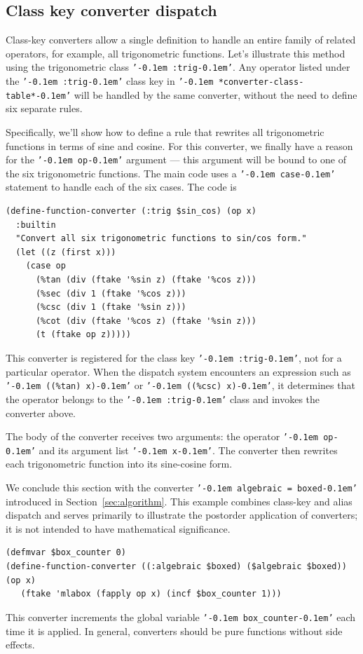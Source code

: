 \documentclass[12pt,fleqn]{extarticle}
\newcommand{\ttq}[1]{\texttt{'\kern-0.1em #1\kern-0.1em'}}
\newenvironment{maximabox}
  {\begin{tcolorbox}[
      breakable,
      enhanced,
      colback=white,
      colframe=black!8,
      boxrule=0pt,
      borderline west={2.2pt}{0pt}{black!25},
      arc=1pt,
      left=11pt,
      right=7pt,
      top=9pt,
      bottom=9pt,
      before skip=14pt,
      after skip=14pt
    ]}
  {\end{tcolorbox}}
\begin{document}
\subsection{Class key converter dispatch}
\label{sec:classkey}

Class-key converters allow a single definition to handle an entire family of
related operators, for example, all trigonometric functions.  Let's illustrate this 
method using the trigonometric class \ttq{:trig}. Any operator listed under the
\ttq{:trig} class key in \ttq{*converter-class-table*} will be handled
by the same converter, without the need to define six separate rules. 

Specifically,  we'll show how to define a rule that rewrites all trigonometric functions in terms of sine
and cosine. For this converter, we finally have a reason for the \ttq{op} argument --- this
argument will be bound to one of the six trigonometric functions.  The
main code uses a \ttq{case} statement to handle each of the six cases. The code is

\begin{maximabox}
\begin{verbatim}
(define-function-converter (:trig $sin_cos) (op x)
  :builtin
  "Convert all six trigonometric functions to sin/cos form."
  (let ((z (first x)))
    (case op   
      (%tan (div (ftake '%sin z) (ftake '%cos z)))
      (%sec (div 1 (ftake '%cos z)))
      (%csc (div 1 (ftake '%sin z)))
      (%cot (div (ftake '%cos z) (ftake '%sin z)))
      (t (ftake op z)))))
\end{verbatim}
\end{maximabox}
This converter is registered for the class key \ttq{:trig}, not for a particular
operator. When the dispatch system encounters an expression such as
\ttq{((\%tan) x)} or \ttq{((\%csc) x)}, it determines that the operator
belongs to the \ttq{:trig} class and invokes the converter above.

The body of the converter receives two arguments: the operator \ttq{op}
and its argument list \ttq{x}. The converter then rewrites each
trigonometric function into its sine-cosine form. 

We conclude this section with the converter \ttq{algebraic = boxed} introduced in Section~\ref{sec:algorithm}. This example combines class-key and alias dispatch and serves primarily to illustrate the postorder application of converters; it is not intended to have mathematical significance.
\begin{maximabox}
\begin{verbatim}
(defmvar $box_counter 0)
(define-function-converter ((:algebraic $boxed) ($algebraic $boxed)) (op x)
   (ftake 'mlabox (fapply op x) (incf $box_counter 1))) 
\end{verbatim}
\end{maximabox}
\noindent This converter increments the global variable \ttq{box\_counter} each time it is applied. In general, converters should be pure functions without side effects.
\end{document}
